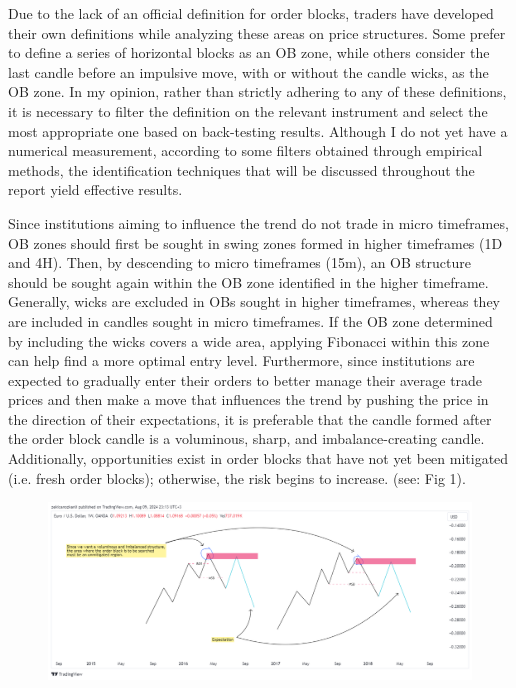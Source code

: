 
Due to the lack of an official definition for order blocks, traders have developed their own definitions while analyzing these areas on price structures. Some prefer to define a series of horizontal blocks as an OB zone, while others consider the last candle before an impulsive move, with or without the candle wicks, as the OB zone. In my opinion, rather than strictly adhering to any of these definitions, it is necessary to filter the definition on the relevant instrument and select the most appropriate one based on back-testing results. Although I do not yet have a numerical measurement, according to some filters obtained through empirical methods, the identification techniques that will be discussed throughout the report yield effective results.

Since institutions aiming to influence the trend do not trade in micro timeframes, OB zones should first be sought in swing zones formed in higher timeframes (1D and 4H). Then, by descending to micro timeframes (15m), an OB structure should be sought again within the OB zone identified in the higher timeframe. Generally, wicks are excluded in OBs sought in higher timeframes, whereas they are included in candles sought in micro timeframes. If the OB zone determined by including the wicks covers a wide area, applying Fibonacci within this zone can help find a more optimal entry level. Furthermore, since institutions are expected to gradually enter their orders to better manage their average trade prices and then make a move that influences the trend by pushing the price in the direction of their expectations, it is preferable that the candle formed after the order block candle is a voluminous, sharp, and imbalance-creating candle. Additionally, opportunities exist in order blocks that have not yet been mitigated (i.e. fresh order blocks); otherwise, the risk begins to increase. (see: Fig 1).

\begin{figure}[h]
    \centering
    \includegraphics[scale=0.35]{Images/OB-1.png}
    \caption{}
    \label{Fig.1}
\end{figure}

